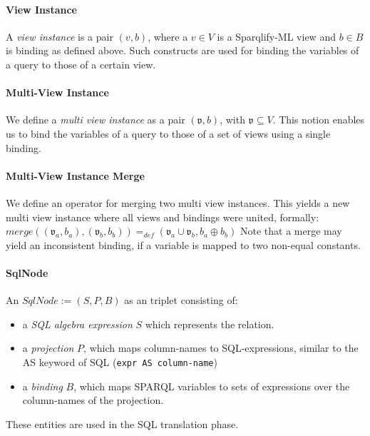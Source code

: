 \documentclass[a4paper,twoside,bibtotoc,abstracton,12pt,BCOR=15mm]{scrreprt}
\newcommand{\todo}[1]{\textbf{ToDo: \textit{#1}}}
\begin{document}



\paragraph{View Instance}
A \emph{view instance} is a pair $(v, b)$, where a $v \in V$ is a Sparqlify-ML view and $b \in B$ is binding as defined above.
Such constructs are used for binding the variables of a query to those of a certain view.

\paragraph{Multi-View Instance}
We define a \emph{multi view instance} as a pair $(\mathfrak{v}, b)$, with $\mathfrak{v} \subseteq V$. 
This notion enables us to bind the variables of a query to those of a set of views using a single binding.



\paragraph{Multi-View Instance Merge}
We define an operator for merging two multi view instances. 
This yields a new multi view instance where all views and bindings were united, formally: 
$merge((\mathfrak{v}_a, b_a), (\mathfrak{v}_b, b_b)) =_{def} (\mathfrak{v}_a \cup \mathfrak{v}_b, b_a \oplus b_b)$
Note that a merge may yield an inconsistent binding, if a variable is mapped to two non-equal constants.

\paragraph{SqlNode}
An $SqlNode := (S, P, B)$ as an triplet consisting of:
\begin{itemize}
  \item a \emph{SQL algebra expression} $S$ which represents the relation.
  \item a \emph{projection} $P$, which maps column-names to SQL-expressions, similar to the AS keyword of SQL (\texttt{expr AS column-name})
  \item a \emph{binding} $B$, which maps SPARQL variables to sets of expressions over the column-names of the projection.
\end{itemize}
These entities are used in the SQL translation phase. 
\end{document}

